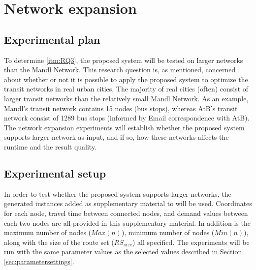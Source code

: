 \section{Network expansion}

\subsection{Experimental plan}
To determine \vref{itm:RQ3}, the proposed system will be tested on larger networks than the Mandl Network. This research question is, as mentioned, concerned about whether or not it is possible to apply the proposed system to optimize the transit networks in real urban cities. The majority of real cities (often) consist of larger transit networks than the relatively small Mandl Network. As an example, Mandl's transit network contains 15 nodes (bus stops), whereas AtB's transit network consist of 1289 bus stops (informed by Email correspondence with AtB). The network expansion experiments will establish whether the proposed system supports larger network as input, and if so, how these networks affects the runtime and the result quality.



\subsection{Experimental setup}
\label{subsec:scalabilityExperiments_setup}

In order to test whether the proposed system supports larger networks, the generated instances added as supplementary material to \citet{mumford13} will be used. Coordinates for each node, travel time between connected nodes, and demand values between each two nodes are all provided in this supplementary material. In addition is the maximum number of nodes ($Max(n)$), minimum number of nodes ($Min(n)$), along with the size of the route set ($RS_{size}$) all specified. The experiments will be run with the same parameter values as the selected values described in Section \vref{sec:parametersettings}.

